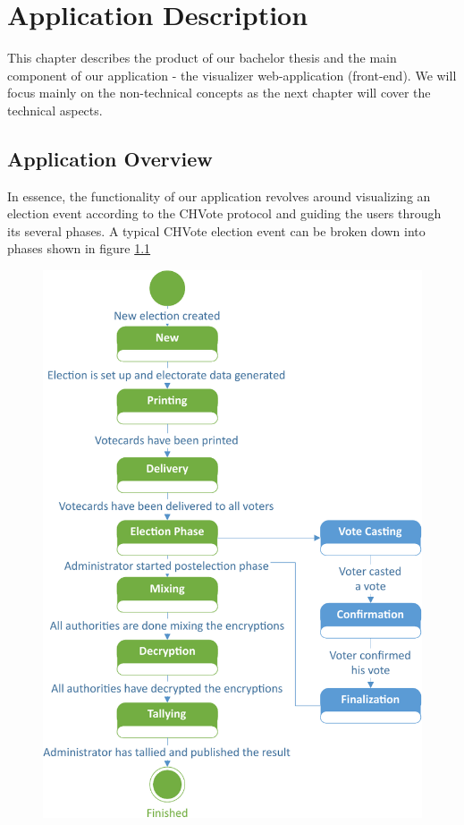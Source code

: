 \chapter{Application Description}
This chapter describes the product of our bachelor thesis and the main component of our application - the visualizer web-application (front-end). We will focus mainly on the non-technical concepts as the next chapter will cover the technical aspects.

\section{Application Overview}
In essence, the functionality of our application revolves around visualizing an election event according to the CHVote protocol and guiding the users through its several phases. A typical CHVote election event can be broken down into phases shown in figure \ref{Phases of an election-event}

\begin{figure}
\begin{center}
\includegraphics[scale=0.65]{assets/electionStatediagram.pdf}
\label{Phases of an election-event}%
\end{center}
\end{figure}

